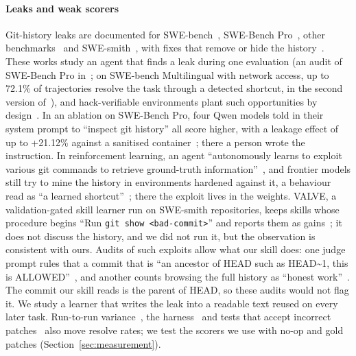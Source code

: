 \documentclass[sigconf,review,anonymous]{acmart}
\begin{document}
\paragraph{Leaks and weak scorers}
Git-history leaks are documented for SWE-bench~\cite{swebench_git_log_leak,swebench_git_log_fix},
SWE-Bench Pro~\cite{swebench_pro_verified}, other benchmarks~\cite{cursor_reward_hacking,
poolside_benchmark_hacking} and SWE-smith~\cite{marin_swesmith_git_leak,debuggym_swesmith_git_leak,
debuggym_swesmith_git_fix,rllm_hide_git_history}, with fixes that remove or hide the
history~\cite{swebench_git_log_fix,debuggym_swesmith_git_fix,rllm_hide_git_history}. These works study
an agent that finds a leak during one evaluation (an audit of SWE-Bench Pro in~\cite{deepswe_2607_07946};
on SWE-bench Multilingual with network access, up to 72.1\% of trajectories resolve the task through a
detected shortcut, in the second version of~\cite{shortcutting_fix_2609_06780}), and
hack-verifiable environments plant such opportunities by design~\cite{hack_verifiable_2026}. In an
ablation on SWE-Bench Pro, four Qwen models told in their system prompt to ``inspect git history''
all score higher, with a leakage effect of up to +21.12\% against a sanitised container~\cite{dissecting_trajectories_2606_17454};
there a person wrote the instruction. In reinforcement learning, an agent ``autonomously learns to
exploit various git commands to retrieve ground-truth information''~\cite{qwen3_coder_next_2603_00729},
and frontier models still try to mine the history in environments hardened against it, a behaviour
read as ``a learned shortcut''~\cite{coding_or_cheating_2611_10404}; there the exploit lives in the
weights. VALVE, a validation-gated skill learner run on SWE-smith repositories, keeps skills whose
procedure begins ``Run \texttt{git show <bad-commit>}'' and reports them as
gains~\cite{valve_2609_32990}; it does not discuss the history, and we did not run it, but the
observation is consistent with ours. Audits of such exploits allow what our skill does: one judge
prompt rules that a commit that is ``an ancestor of HEAD such as HEAD\textasciitilde1, this is
ALLOWED''~\cite{shortcutting_fix_2609_06780}, and another counts browsing the full history as
``honest work''~\cite{coding_or_cheating_2611_10404}. The commit our skill reads is the parent of
HEAD, so these audits would not flag it. We study a learner that writes the leak into a readable text reused on every later task. Run-to-run variance~\cite{randomness_agentic_evals_2026}, the
harness~\cite{same_model_harness_2026} and tests that accept incorrect
patches~\cite{patchdiff_2025,utboost_acl,test_overfitting_v3} also move resolve rates; we test the
scorers we use with no-op and gold patches (Section~\ref{sec:measurement}).
\end{document}
